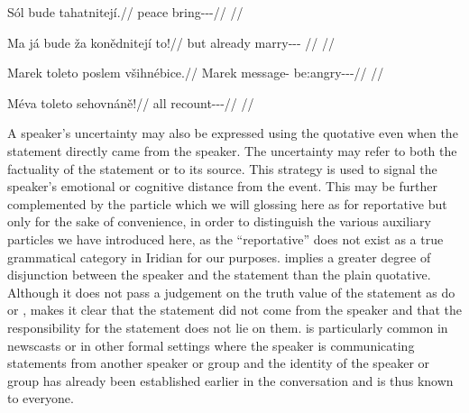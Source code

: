 \pex
\begingl
  \gla Sól bude tahatnitejí.//
  \glb peace \Dub{} bring-\Pv{}-\SupP{}-\Quot{}//
  \glft {}//
\endgl
\xe

\pex
\begingl
  \gla Ma já bude ža konědnitejí to!//
  \glb but \Second{}\Sg{} \Dub{} already marry-\Pv{}-\SupP{}-\Quot{} \Rel{}//
  \glft {}//
\endgl
\xe


\pex
\begingl
  \gla Marek toleto poslem všihnébice.//
  \glb Marek \Aff{} message-\Agt{} be:angry-\Ben{}-\Pf{}-\Quot{}//
  \glft {}//
\endgl
\xe

\pex
\begingl
  \gla Méva toleto sehovn\'aně!//
  \glb all \Aff{} recount-\Pv{}-\Ret{}-\Quot{}//
  \glft {}//
\endgl
\xe


A speaker’s uncertainty may also be expressed using the quotative even when the statement directly came from the speaker. The uncertainty may refer to both the factuality of the statement or to its source. This strategy is used to signal the speaker’s emotional or cognitive distance from the event. This may be further complemented by the particle  which we will glossing here as \Rep{} for reportative but only for the sake of convenience, in order to distinguish the various auxiliary particles we have introduced here, as the “reportative” does not exist as a true grammatical category in Iridian for our purposes.  implies a greater degree of disjunction between the speaker and the statement than the plain quotative. Although it does not pass a judgement on the truth value of the statement as do  or ,  makes it clear that the statement did not come from the speaker and that the responsibility for the statement does not lie on them.  is particularly common in newscasts or in other formal settings where the speaker is communicating statements from another speaker or group and the identity of the speaker or group has already been established earlier in the conversation and is thus known to everyone.

\pex
{}\smallskip\\
{\footnotesize{}}
\xe

